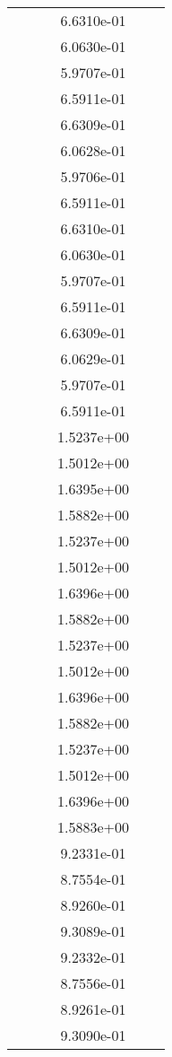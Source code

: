 \begin{xltabular}{\textwidth}{r|rS[table-format=1.3e+2]S[table-format=1.4e+2]S[table-format=1.4e+2]S[table-format=-1.5]}
&  &  & 6.6310e-01 & & \\
&  &  & 6.0630e-01 & & \\
&  &  & 5.9707e-01 & & \\
&  &  & 6.5911e-01 & & \\
&  &  & 6.6309e-01 & & \\
&  &  & 6.0628e-01 & & \\
&  &  & 5.9706e-01 & & \\
&  &  & 6.5911e-01 & & \\
&  &  & 6.6310e-01 & & \\
&  &  & 6.0630e-01 & & \\
&  &  & 5.9707e-01 & & \\
&  &  & 6.5911e-01 & & \\
&  &  & 6.6309e-01 & & \\
&  &  & 6.0629e-01 & & \\
&  &  & 5.9707e-01 & & \\
&  &  & 6.5911e-01 & & \\
&  &  & 1.5237e+00 & & \\
&  &  & 1.5012e+00 & & \\
&  &  & 1.6395e+00 & & \\
&  &  & 1.5882e+00 & & \\
&  &  & 1.5237e+00 & & \\
&  &  & 1.5012e+00 & & \\
&  &  & 1.6396e+00 & & \\
&  &  & 1.5882e+00 & & \\
&  &  & 1.5237e+00 & & \\
&  &  & 1.5012e+00 & & \\
&  &  & 1.6396e+00 & & \\
&  &  & 1.5882e+00 & & \\
&  &  & 1.5237e+00 & & \\
&  &  & 1.5012e+00 & & \\
&  &  & 1.6396e+00 & & \\
&  &  & 1.5883e+00 & & \\
&  &  & 9.2331e-01 & & \\
&  &  & 8.7554e-01 & & \\
&  &  & 8.9260e-01 & & \\
&  &  & 9.3089e-01 & & \\
&  &  & 9.2332e-01 & & \\
&  &  & 8.7556e-01 & & \\
&  &  & 8.9261e-01 & & \\
&  &  & 9.3090e-01 & & \\

\end{xltabular}
